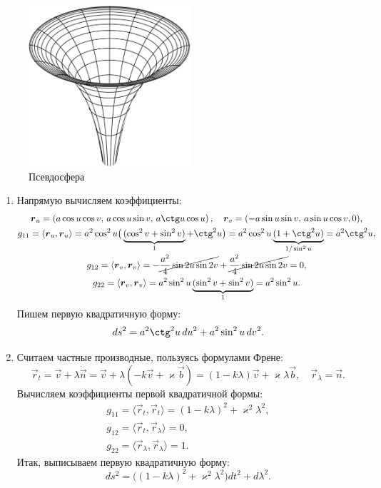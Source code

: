 \begin{figure}[H]
	\centering
	\includegraphics[width=6cm]{./img/Pseudosphere.pdf}
	\caption{Псевдосфера}
\end{figure}

\pagebreak

\begin{solution}
	\begin{enumerate}[nolistsep, label=(\arabic*)]
		\item Напрямую вычисляем коэффициенты\footnotemark:
			\begin{gather*}
				\vec{r}_u = \br{a\cos u\cos v,\,a\cos u\sin v,\,a\ctg u\cos u},\quad \vec{r}_v = (-a\sin u\sin v,\,a\sin u\cos v, 0),\\
				g_{11} = \langle\vec{r}_u, \vec{r}_u\rangle = a^2\cos^2u\big(\underbrace{(\cos^2v + \sin^2v)}_1 + \ctg^2u\big) = a^2\cos^2u\underbrace{(1 + \ctg^2u)}_{1 / \sin^2u} = a^2\ctg^2u,\\
				g_{12} = \langle\vec{r}_v, \vec{r}_v\rangle = -\cancel{\frac{a^2}{4}\sin2u\sin2v} + \cancel{\frac{a^2}{4}\sin2u\sin2v} = 0,\\
				g_{22} = \langle\vec{r}_v, \vec{r}_v\rangle = a^2\sin^2u\underbrace{(\sin^2v + \sin^2v)}_1 = a^2\sin^2u.
			\end{gather*}%
			Пишем первую квадратичную форму:
			\[
				ds^2 = a^2\ctg^2u\,du^2 + a^2\sin^2u\,dv^2.
			\]
		\item Считаем частные производные, пользуясь формулами Френе:
			\[
				\vec{r}_t = \vec{v} + \lambda\dot{\vec{n}} = \vec{v} + \lambda(-k\vec{v} + \varkappa\vec{b}) = (1 - k\lambda)\vec{v} + \varkappa\lambda\vec{b},\quad \vec{r}_\lambda = \vec{n}.
			\]
			Вычисляем коэффициенты первой квадратичной формы:
			\begin{gather*}
				g_{11} = \langle\vec{r}_t, \vec{r}_t\rangle = (1 - k\lambda)^2 + \varkappa^2\lambda^2,\\
				g_{12} = \langle\vec{r}_t, \vec{r}_\lambda\rangle = 0,\\
				g_{22} = \langle\vec{r}_\lambda, \vec{r}_\lambda\rangle = 1.
			\end{gather*}
			Итак, выписываем первую квадратичную форму:
			\[
				ds^2 = \big((1 - k\lambda)^2 + \varkappa^2\lambda^2\big)dt^2 + d\lambda^2.
			\]
	\end{enumerate}
\end{solution}

